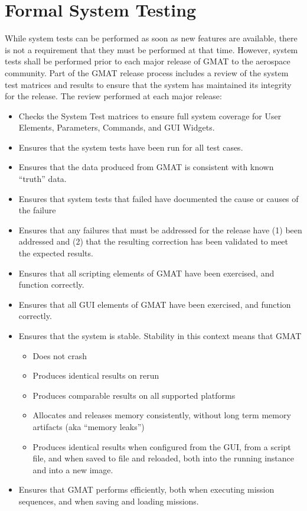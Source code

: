 \section{Formal System Testing}

While system tests can be performed as soon as new features are available, there is not a
requirement that they must be performed at that time.  However, system tests shall be performed
prior to each major release of GMAT to the aerospace community.  Part of the GMAT release process
includes a review of the system test matrices and results to ensure that the system has maintained
its integrity for the release.  The review performed at each major release:

\begin{itemize}
\item Checks the System Test matrices to ensure full system coverage for User Elements, Parameters,
Commands, and GUI Widgets.
\item Ensures that the system tests have been run for all test cases.
\item Ensures that the data produced from GMAT is consistent with known ``truth'' data.
\item Ensures that system tests that failed have documented the cause or causes of the failure
\item Ensures that any failures that must be addressed for the release have (1) been addressed and
(2) that the resulting correction has been validated to meet the expected results.
\item Ensures that all scripting elements of GMAT have been exercised, and function correctly.
\item Ensures that all GUI elements of GMAT have been exercised, and function correctly.
\item Ensures that the system is stable.  Stability in this context means that GMAT
\begin{itemize}
\item Does not crash
\item Produces identical results on rerun
\item Produces comparable results on all supported platforms
\item Allocates and releases memory consistently, without long term memory artifacts (aka ``memory
leaks'')
\item Produces identical results when configured from the GUI, from a script file, and when saved to
file and reloaded, both into the running instance and into a new image.
\end{itemize}
\item Ensures that GMAT performs efficiently, both when executing mission sequences, and when saving
and loading missions.
\end{itemize}

